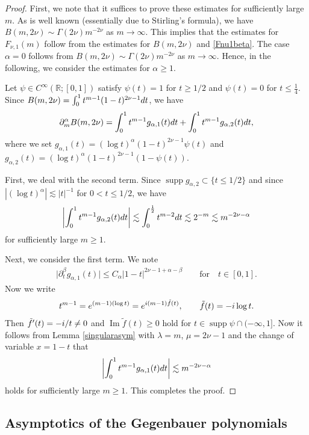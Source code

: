 \documentclass[11pt]{article}
\numberwithin{equation}{section}
\def\R{\mathbb{R}}%
\DeclareMathOperator{\supp}{supp}%
\DeclareMathOperator{\im}{Im}%
\def\a{\alpha}
\def\b{\beta}
\def\g{\psi}
\def\l{\lambda}
\def\m{\mu}
\def\n{\nu}
\def\pa{\partial}
\begin{document}
\begin{proof}First, we note that it suffices to prove these estimates for sufficiently large $m$. As is well known (essentially due to Stirling's formula), we have $B(m,2\n)\sim \Gamma(2\n)m^{-2\n}$ as $m\to \infty$.
This implies that the estimates for $F_{\n,1}(m)$ follow from the estimates for $B(m,2\n)$ and \eqref{Fnu1beta}. The case $\a=0$ follows from $B(m,2\n)\sim \Gamma(2\n)m^{-2\n}$ as $m\to \infty$. Hence, in the following, we consider the estimates for $\a\geq 1$.

Let $\g\in C^{\infty}(\R;[0,1])$ satisfy $\g(t)=1$ for $t\geq 1/2$ and $\g(t)=0$ for $t\leq \frac{1}{4}$.
Since $B(m,2\n)=\int_0^1t^{m-1}(1-t)^{2\n-1}{\rm d}t$, we have
\begin{align*}
\pa_m^{\a}B(m,2\n)=\int_0^1t^{m-1}g_{\a,1}(t){\rm d}t+\int_0^1t^{m-1}g_{\a,2}(t){\rm d}t,
\end{align*}
where we set $g_{\a,1}(t)=(\log t)^{\a}(1-t)^{2\n-1}\g(t)$ and $g_{\a,2}(t)=(\log t)^{\a}(1-t)^{2\n-1}(1-\g(t))$.

First, we deal with the second term. Since $\supp g_{\a,2}\subset \{t\leq 1/2\}$ and since $|(\log t)^{\a}|\lesssim |t|^{-1}$ for $0<t\leq 1/2$, we have
\begin{align*}
\left|\int_0^1t^{m-1}g_{\a,2}(t){\rm d}t\right|\lesssim \int_0^{\frac{1}{2}}t^{m-2}{\rm d}t\lesssim 2^{-m}\lesssim m^{-2\n-\a}
\end{align*}
for sufficiently large $m\geq 1$.

Next, we consider the first term. We note
\begin{align*}
\big|\pa_{t}^{\b}g_{\a,1}(t)\big|\leq C_{\a}|1-t|^{2\n-1+\a-\b}\qquad\text{for}\quad t\in [0,1].
\end{align*}
Now we write
\begin{align*}
t^{m-1}={\rm e}^{(m-1)(\log t)}={\rm e}^{{\rm i}(m-1)\tilde{f}(t)},\qquad \tilde{f}(t)=-{\rm i}\log t.
\end{align*}
Then $\tilde{f}'(t)=-{\rm i}/t\neq 0$ and $\im \tilde{f}(t)\geq 0$ hold for $t\in \supp \g\cap (-\infty,1]$.
Now it follows from Lemma \ref{singularasym} with $\l=m$, $\m=2\n-1$ and the change of variable $x=1-t$ that
\begin{align*}
\left|\int_0^1t^{m-1}g_{\a,1}(t){\rm d}t\right|\lesssim m^{-2\n-\a}
\end{align*}
holds for sufficiently large $m\geq 1$. This completes the proof.
\end{proof}

\subsection{Asymptotics of the Gegenbauer polynomials}\label{appasymgegensubsec}
\end{document}
